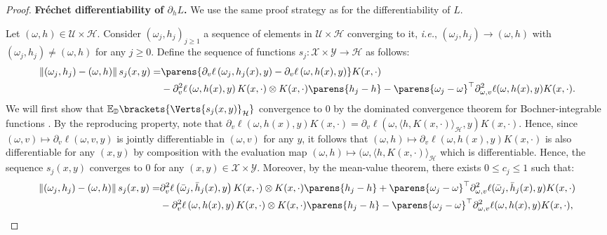 \begin{proof}
{\bf Fr\'echet differentiability of $\partial_h L$. } We use the same proof strategy as for the differentiability of $L$.  

Let $(\omega, h)\in \mathcal{U}\times \mathcal{H}$. Consider $(\omega_j,h_j)_{j\geq 1}$ a sequence of elements in $\mathcal{U}\times \mathcal{H}$ converging to it, \textit{i.e.}, $(\omega_j,h_j)\rightarrow (\omega,h)$ with $(\omega_j,h_j)\neq (\omega,h)$ for any $j\geq 0$.    
	Define the sequence of functions $s_j:\mathcal{X}\times\mathcal{Y}\to\mathcal{H}$ as follows:
    \begin{align}\label{eq:expression_sn}
    \begin{split}
\left\|(\omega_j,h_j)-(\omega,h)\right\|s_j(x,y)= &\parens{\partial_v\ell\left(\omega_j,h_j(x),y\right)-\partial_v\ell\left(\omega,h(x),y\right)}K(x,\cdot)\\
&-\partial_v^2\ell\left(\omega,h(x),y\right)K(x,\cdot)\otimes K(x,\cdot)\parens{h_j-h}
- \parens{\omega_j-\omega}^{\top} \partial_{\omega,v}^2\ell(\omega,h(x),y)K(x,\cdot).
    \end{split}
\end{align}
 We will first show that $\mathbb{E}_{\mathbb{D}}\brackets{\Verts{s_j(x,y)}_{\mathcal{H}}}$ convergence to $0$ by the dominated convergence theorem for Bochner-integrable functions \citep[Theorem~3,~Chapter~2]{diestel1977vector}. 
	By the reproducing property, note that $\partial_v\ell(\omega,h(x),y)K(x,\cdot) = \partial_v\ell(\omega,\langle h,K(x,\cdot)\rangle_{\mathcal{H}},y)K(x,\cdot)$. Hence, since $(\omega,v)\mapsto\partial_v\ell(\omega,v,y)$ is jointly differentiable in $(\omega,v)$ for any $y$, it follows that $(\omega,h)\mapsto \partial_v\ell(\omega,h(x),y)K(x,\cdot)$ is also differentiable for any $(x,y)$ by composition with the evaluation map $(\omega,h)\mapsto (\omega, \langle h,K(x,\cdot)\rangle_{\mathcal{H}}$ which is differentiable. Hence, the sequence $s_j(x,y)$ converges to $0$ for any $(x,y)\in \mathcal{X}\times \mathcal{Y}$. Moreover, by the mean-value theorem, there exists $0\leq c_j\leq 1$ such that:
\begin{align*}
    \begin{split}
\left\|(\omega_j,h_j)-(\omega,h)\right\|s_j(x,y) =& \partial_v^2\ell\left(\bar{\omega}_j,\bar{h}_j(x),y\right)K(x,\cdot)\otimes K(x,\cdot)\parens{h_j-h}
+ \parens{\omega_j-\omega}^{\top} \partial_{\omega,v}^2\ell(\bar{\omega}_j,\bar{h}_j(x),y)K(x,\cdot)\\
&-\partial_v^2\ell\left(\omega,h(x),y\right)K(x,\cdot)\otimes K(x,\cdot)\parens{h_j-h}
- \parens{\omega_j-\omega}^{\top} \partial_{\omega,v}^2\ell(\omega,h(x),y)K(x,\cdot),

\end{split}
\end{align*}
\end{proof}
